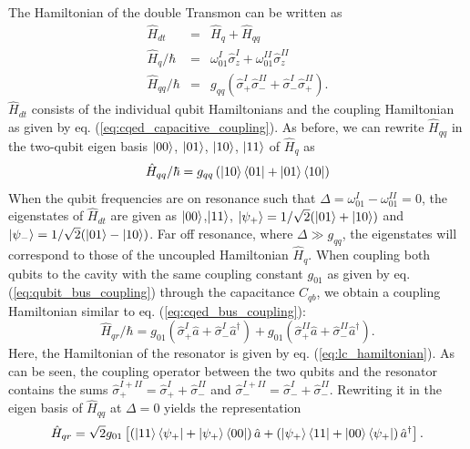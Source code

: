The Hamiltonian of the double Transmon can be written as
%
\begin{eqnarray}
\hat{H}_{dt}       & = & \hat{H}_q+\hat{H}_{qq} \\
\hat{H}_{q}/\hbar  & = & \omega_{01}^I\hat{\sigma}_z^I+\omega_{01}^{II}\hat{\sigma}_z^{II} \\
\hat{H}_{qq}/\hbar & = & g_{qq}\left(\hat{\sigma}_+^I\hat{\sigma}_-^{II}+\hat{\sigma}_-^I\hat{\sigma}_+^{II}\right).
\end{eqnarray}
%
$\hat{H}_{dt}$ consists of the individual qubit Hamiltonians and the coupling Hamiltonian as given by eq. (\ref{eq:cqed_capacitive_coupling}). As before, we can rewrite $\hat{H}_{qq}$ in the two-qubit eigen basis $\left| 00 \right>$, $\left| 01 \right>$, $\left| 10 \right>$, $\left| 11 \right>$ of $\hat{H}_q$ as
%
\begin{equation}
\hat{H}_{qq}/\hbar = g_{qq}\left(\left| 10 \right>\left< 01 \right|+\left| 01 \right>\left< 10 \right|\right)
\end{equation}
%
When the qubit frequencies are on resonance such that $\Delta = \omega_{01}^I-\omega_{01}^{II}=0$, the eigenstates of $\hat{H}_{dt}$ are given as $\left| 00 \right>$,$\left| 11 \right>$, $\left| \psi_+ \right>=1/\sqrt{2}(\left| 01 \right>+\left| 10 \right>)$ and $\left| \psi_- \right>=1/\sqrt{2}(\left| 01 \right>-\left| 10 \right>)$. Far off resonance, where $\Delta \gg g_{qq}$, the eigenstates will correspond to those of the uncoupled Hamiltonian $\hat{H}_{q}$. When coupling both qubits to the cavity with the same coupling constant $g_{01}$ as given by eq. (\ref{eq:qubit_bus_coupling}) through the capacitance $C_{qb}$, we obtain a coupling Hamiltonian similar to eq. (\ref{eq:cqed_bus_coupling}):
%
\begin{equation}
\hat{H}_{qr}/\hbar = g_{01}\left(\hat{\sigma}_+^I\hat{a}+\hat{\sigma}_-^I\hat{a}^\dagger\right)+g_{01}\left(\hat{\sigma}_+^{II}\hat{a}+\hat{\sigma}_-^{II}\hat{a}^\dagger \right). \label{eq:double_transmon_resonator_coupling}
\end{equation}
%
Here, the Hamiltonian of the resonator is given by eq. (\ref{eq:lc_hamiltonian}). As can be seen, the coupling operator between the two qubits and the resonator contains the sums $\hat{\sigma}_+^{I+II}=\hat{\sigma}_+^I+\hat{\sigma}_-^{II}$ and $\hat{\sigma}_-^{I+II}=\hat{\sigma}_-^I+\hat{\sigma}_-^{II}$. Rewriting it in the eigen basis of $\hat{H}_{qq}$ at $\Delta=0$ yields the representation
%
\begin{equation}
\hat{H}_{qr} = \sqrt{2}g_{01}\left[\left(\left| 11 \right>\left< \psi_+ \right|+\left| \psi_+ \right>\left< 00 \right|\right)\hat{a}+\left(\left| \psi_+ \right>\left< 11 \right|+\left| 00 \right>\left< \psi_+ \right|\right)\hat{a}^\dagger\right].
\end{equation}
